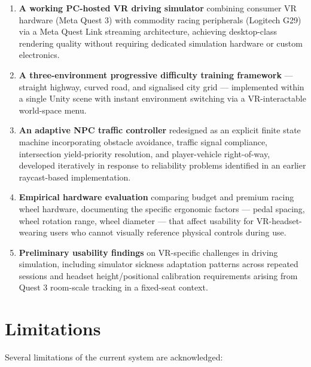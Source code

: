 \begin{enumerate}
    \item \textbf{A working PC-hosted VR driving simulator} combining consumer VR hardware (Meta Quest 3) with commodity racing peripherals (Logitech G29) via a Meta Quest Link streaming architecture, achieving desktop-class rendering quality without requiring dedicated simulation hardware or custom electronics.
    
    \item \textbf{A three-environment progressive difficulty training framework} — straight highway, curved road, and signalised city grid — implemented within a single Unity scene with instant environment switching via a VR-interactable world-space menu.
    
    \item \textbf{An adaptive NPC traffic controller} redesigned as an explicit finite state machine incorporating obstacle avoidance, traffic signal compliance, intersection yield-priority resolution, and player-vehicle right-of-way, developed iteratively in response to reliability problems identified in an earlier raycast-based implementation.
    
    \item \textbf{Empirical hardware evaluation} comparing budget and premium racing wheel hardware, documenting the specific ergonomic factors — pedal spacing, wheel rotation range, wheel diameter — that affect usability for VR-headset-wearing users who cannot visually reference physical controls during use.
    
    \item \textbf{Preliminary usability findings} on VR-specific challenges in driving simulation, including simulator sickness adaptation patterns across repeated sessions and headset height/positional calibration requirements arising from Quest 3 room-scale tracking in a fixed-seat context.
\end{enumerate}

\section{Limitations}

Several limitations of the current system are acknowledged:

